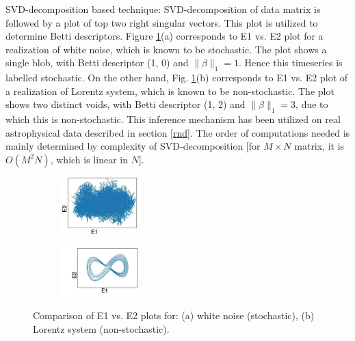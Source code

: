 \documentclass[journal]{IEEEtran}
\begin{document}
	SVD-decomposition based technique: SVD-decomposition of data matrix is followed by a plot of top two right singular vectors. This plot is utilized to determine Betti descriptors. Figure \ref{e1e2plots}(a) corresponds to E1 vs. E2 plot for a realization of white noise, which is known to be stochastic. The plot shows a single blob, with Betti descriptor (1, 0) and $\|\beta\|_1 = 1$. Hence this timeseries is labelled stochastic. On the other hand, Fig. \ref{e1e2plots}(b) corresponds to E1 vs. E2 plot of a realization of Lorentz system, which is known to be non-stochastic.  The plot shows two distinct voids, with Betti descriptor (1, 2) and $\|\beta\|_1 = 3$, due to which this is non-stochastic. This inference mechanism has been utilized on real astrophysical data described in section \ref{rnd}.
	The order of computations needed is mainly determined by complexity of SVD-decomposition [for $M \times N$ matrix, it is $O(M^2N)$, which is linear in $N$].

%		
%		

\begin{figure}
	\centering
	
	\begin{subfigure}[]
		\centering
		\includegraphics[width=3cm]{svd_white_noise_crop.jpg}
	\end{subfigure}
	\begin{subfigure}[]
		\centering
		\includegraphics[width=3cm]{Lorenz_e1_vs_e2_2_2.jpg}
	\end{subfigure}
	\caption{Comparison of E1 vs. E2 plots for: (a) white noise (stochastic), (b) Lorentz system (non-stochastic).}
	\label{e1e2plots}
	\end{figure}
	
\end{document}
